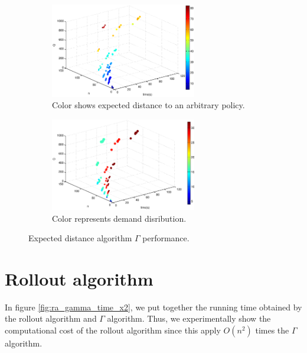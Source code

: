 \begin{figure}[!htbp]
  \begin{center}
  \begin{subfigure}[h]{1\textwidth}
   \includegraphics[width=0.7\textwidth]{Images/Chapter5/expected_distance3D.eps}
   \caption{Color shows expected distance to an arbitrary policy.}\label{fig:expected_distance3D_time}
  \end{subfigure}
  \begin{subfigure}[h]{1\textwidth}
   \includegraphics[width=0.7\textwidth]{Images/Chapter5/expected_distance3D_range.eps}
   \caption{Color represents demand disribution.}\label{fig:expected_distance3D_range_time}
  \end{subfigure}
   
  \end{center}
    \caption{Expected distance algorithm  $\Gamma$ performance.}\label{fig:expected_distance3D}
\end{figure}

\clearpage

\section{Rollout algorithm}

In figure \ref{fig:ra_gamma_time_x2}, we put together the running time obtained by the rollout algorithm and $\Gamma$ algorithm. Thus, we experimentally show  the computational cost of the rollout algorithm since this apply $O(n^2)$ times the $\Gamma$ algorithm.

